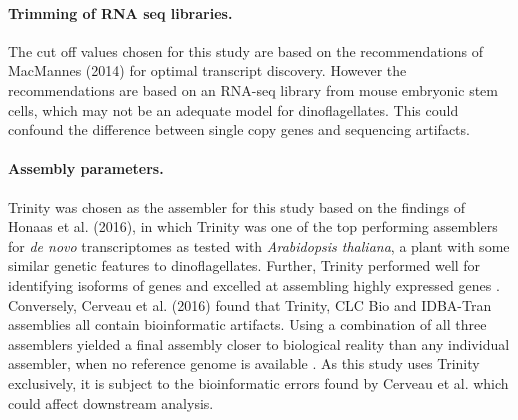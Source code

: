 \documentclass[12pt]{article}
\begin{document}
\paragraph*{Trimming of RNA seq libraries.} The cut off values chosen for this study are based on the recommendations of MacMannes (2014) for optimal transcript discovery. However the recommendations are based on an RNA-seq library from mouse embryonic stem cells, which may not be an adequate model for dinoflagellates. 
This could confound the difference between single copy genes and sequencing artifacts.
\paragraph*{Assembly parameters.}
Trinity was chosen as the assembler for this study based on the findings of Honaas et al. (2016), in which Trinity was one of the top performing assemblers for \textit{de novo} transcriptomes as tested with \textit{Arabidopsis thaliana}, a plant with some similar genetic features to dinoflagellates.
Further, Trinity performed well for identifying isoforms of genes and excelled at assembling highly expressed genes \cite{honaas2016selecting}.
Conversely, Cerveau et al. (2016) found that Trinity, CLC Bio and IDBA-Tran assemblies all contain bioinformatic artifacts. 
Using a combination of all three assemblers yielded a final assembly closer to biological reality than any individual assembler, when no reference genome is available \cite{cerveau2016combining}.
As this study uses Trinity exclusively, it is subject to the bioinformatic errors found by Cerveau et al. which could affect downstream analysis.
\end{document}
